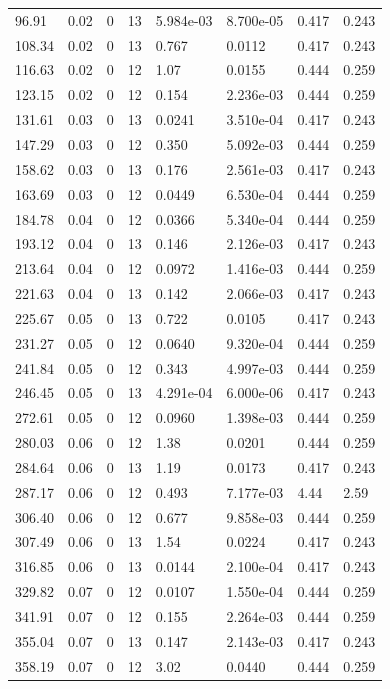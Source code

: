 \documentclass[preview]{standalone}
\begin{document}
{{\begin{tabular}{L{1.2cm}C{1.2cm} C{0.3cm}C{0.5cm} C{1.4cm}C{1.4cm} C{1.4cm}C{1.4cm}}
  96.91  &  0.02  & 0     & 13 &  5.984e-03  & 8.700e-05  & 0.417 &  0.243   \\ 
  108.34  &  0.02  & 0     & 13 &  0.767  & 0.0112  & 0.417 &  0.243   \\ 
  116.63  &  0.02  & 0     & 12 &  1.07  & 0.0155  & 0.444 &  0.259   \\ 
  123.15  &  0.02  & 0     & 12 &  0.154  & 2.236e-03  & 0.444 &  0.259   \\ 
  131.61  &  0.03  & 0     & 13 &  0.0241  & 3.510e-04  & 0.417 &  0.243   \\ 
  147.29  &  0.03  & 0     & 12 &  0.350  & 5.092e-03  & 0.444 &  0.259   \\ 
  158.62  &  0.03  & 0     & 13 &  0.176  & 2.561e-03  & 0.417 &  0.243   \\ 
  163.69  &  0.03  & 0     & 12 &  0.0449  & 6.530e-04  & 0.444 &  0.259   \\ 
  184.78  &  0.04  & 0     & 12 &  0.0366  & 5.340e-04  & 0.444 &  0.259   \\ 
  193.12  &  0.04  & 0     & 13 &  0.146  & 2.126e-03  & 0.417 &  0.243   \\ 
  213.64  &  0.04  & 0     & 12 &  0.0972  & 1.416e-03  & 0.444 &  0.259   \\ 
  221.63  &  0.04  & 0     & 13 &  0.142  & 2.066e-03  & 0.417 &  0.243   \\ 
  225.67  &  0.05  & 0     & 13 &  0.722  & 0.0105  & 0.417 &  0.243   \\ 
  231.27  &  0.05  & 0     & 12 &  0.0640  & 9.320e-04  & 0.444 &  0.259   \\ 
  241.84  &  0.05  & 0     & 12 &  0.343  & 4.997e-03  & 0.444 &  0.259   \\ 
  246.45  &  0.05  & 0     & 13 &  4.291e-04  & 6.000e-06  & 0.417 &  0.243   \\ 
  272.61  &  0.05  & 0     & 12 &  0.0960  & 1.398e-03  & 0.444 &  0.259   \\ 
  280.03  &  0.06  & 0     & 12 &  1.38  & 0.0201  & 0.444 &  0.259   \\ 
  284.64  &  0.06  & 0     & 13 &  1.19  & 0.0173  & 0.417 &  0.243   \\ 
  287.17  &  0.06  & 0     & 12 &  0.493  & 7.177e-03  & 4.44 &  2.59   \\ 
  306.40  &  0.06  & 0     & 12 &  0.677  & 9.858e-03  & 0.444 &  0.259   \\ 
  307.49  &  0.06  & 0     & 13 &  1.54  & 0.0224  & 0.417 &  0.243   \\ 
  316.85  &  0.06  & 0     & 13 &  0.0144  & 2.100e-04  & 0.417 &  0.243   \\ 
  329.82  &  0.07  & 0     & 12 &  0.0107  & 1.550e-04  & 0.444 &  0.259   \\ 
  341.91  &  0.07  & 0     & 12 &  0.155  & 2.264e-03  & 0.444 &  0.259   \\ 
  355.04  &  0.07  & 0     & 13 &  0.147  & 2.143e-03  & 0.417 &  0.243   \\ 
  358.19  &  0.07  & 0     & 12 &  3.02  & 0.0440  & 0.444 &  0.259   \\ 
\hline 
\end{tabular} 

}}
\end{document}
